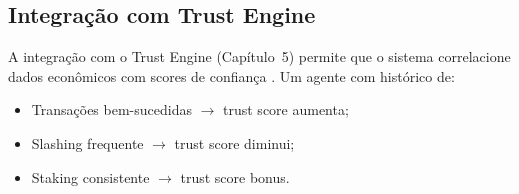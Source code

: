 \subsection{Integração com Trust Engine}

A integração com o Trust Engine (Capítulo~5) permite que o
sistema correlacione dados econômicos com scores de confiança
\cite{opencode2026spec038, opencode2026token}. Um agente com
histórico de:
\begin{itemize}
\item Transações bem-sucedidas $\to$ trust score aumenta;
\item Slashing frequente $\to$ trust score diminui;
\item Staking consistente $\to$ trust score bonus.
\end{itemize}

